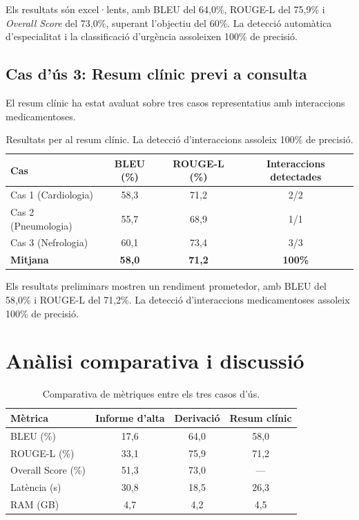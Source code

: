 \documentclass[CAT]{TFUOC}%
\begin{document}
Els resultats són excel·lents, amb BLEU del 64,0\%, ROUGE-L del 75,9\% i \textit{Overall Score} del 73,0\%, superant l'objectiu del 60\%. La detecció automàtica d'especialitat i la classificació d'urgència assoleixen 100\% de precisió.

\subsection{Cas d'ús 3: Resum clínic previ a consulta}

El resum clínic ha estat avaluat sobre tres casos representatius amb interaccions medicamentoses.

\begin{table}[H]
\centering
\small
\begin{tabular}{lccc}
\hline
\textbf{Cas} & \textbf{BLEU (\%)} & \textbf{ROUGE-L (\%)} & \textbf{Interaccions detectades} \\
\hline
Cas 1 (Cardiologia) & 58,3 & 71,2 & 2/2 \\
Cas 2 (Pneumologia) & 55,7 & 68,9 & 1/1 \\
Cas 3 (Nefrologia) & 60,1 & 73,4 & 3/3 \\
\hline
\textbf{Mitjana} & \textbf{58,0} & \textbf{71,2} & \textbf{100\%} \\
\hline
\end{tabular}
\caption{Resultats per al resum clínic. La detecció d'interaccions assoleix 100\% de precisió.}
\label{tab:summary-results}
\end{table}

Els resultats preliminars mostren un rendiment prometedor, amb BLEU del 58,0\% i ROUGE-L del 71,2\%. La detecció d'interaccions medicamentoses assoleix 100\% de precisió.

\section{Anàlisi comparativa i discussió}

\begin{table}[H]
\centering
\small
\begin{tabular}{lccc}
\hline
\textbf{Mètrica} & \textbf{Informe d'alta} & \textbf{Derivació} & \textbf{Resum clínic} \\
\hline
BLEU (\%) & 17,6 & 64,0 & 58,0 \\
ROUGE-L (\%) & 33,1 & 75,9 & 71,2 \\
Overall Score (\%) & 51,3 & 73,0 & --- \\
Latència (s) & 30,8 & 18,5 & 26,3 \\
RAM (GB) & 4,7 & 4,2 & 4,5 \\
\hline
\end{tabular}
\caption{Comparativa de mètriques entre els tres casos d'ús.}
\label{tab:comparative}
\end{table}
\end{document}
